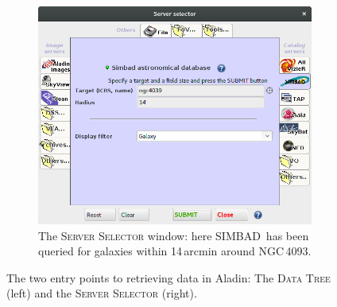 \documentclass [a4paper, 12pt]{article}
\newcommand{\simbad}{{\textsc{SIMBAD}}}
\begin{document}
\begin{figure}[H]
\begin{subfigure}[H]{0.4\textwidth}
        \includegraphics[width=1 
        \textwidth]{../images/aladin_server_selector.png}
        \caption{The \textsc{Server Selector} window: here \simbad\ has been 
        queried for galaxies within 14\,arcmin around NGC\,4093.}
        \label{fig:server_selector}
    \end{subfigure}
    \caption{The two entry points to retrieving data in Aladin: The 
    \textsc{Data Tree} (left) and the \textsc{Server Selector} (right).}
\end{figure}
\end{document}
